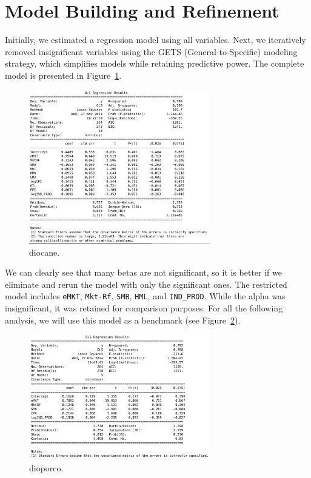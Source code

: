 \section{Model Building and Refinement}

Initially, we estimated a regression model using all variables.
Next, we iteratively removed insignificant variables using the GETS (General-to-Specific) modeling strategy,
which simplifies models while retaining predictive power.
The complete model is presented in Figure~\ref{fig:7_1}.

\begin{figure}[h!]
    \centering
    \includegraphics[width=0.7\textwidth]{images/7_1.png}
    \caption{diocane.}\label{fig:7_1}
\end{figure}

We can clearly see that many betas are not significant, so it is better if we eliminate and rerun the
model with only the significant ones.
The restricted model includes \texttt{eMKT}, \texttt{Mkt-Rf}, \texttt{SMB}, \texttt{HML}, and \texttt{IND\_PROD}.
While the alpha was insignificant, it was retained for comparison purposes. 
For all the following analysis, we will use this model as a benchmark (see Figure~\ref{fig:7_2}).

\begin{figure}[h!]
    \centering
    \includegraphics[width=0.7\textwidth]{images/7_2.png}
    \caption{dioporco.}\label{fig:7_2}
\end{figure}

